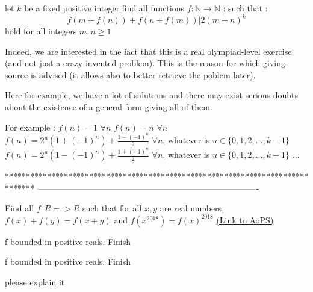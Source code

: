 \begin{solution}
	\begin{tcolorbox}let $k$ be a fixed positive integer
find all functions $f : \mathbb{N} \rightarrow \mathbb{N}$ : such that :
 $$f(m+f(n))+f(n+f(m))  | 2 (m+n)^k$$ 
hold for all integers $m,n \geq 1 $\end{tcolorbox}
Indeed, we are interested in the fact that this is a real olympiad-level exercise (and not just a crazy invented problem). This is the reason for which giving source is advised (it allows also to better retrieve the poblem later).

Here for example, we have a lot of solutions and there may exist serious doubts about the existence of a general form giving all of them.

For example :
$f(n)=1$ $\forall n$
$f(n)=n$ $\forall n$
$f(n)=2^u(1+(-1)^n)+\frac{1-(-1)^n}2$ $\forall n$, whatever is $u\in\{0,1,2,...,k-1\}$
$f(n)=2^u(1-(-1)^n)+\frac{1+(-1)^n}2$ $\forall n$, whatever is $u\in\{0,1,2,...,k-1\}$
...



\end{solution}
*******************************************************************************
-------------------------------------------------------------------------------

\begin{problem}
	Find all $f:R=>R$ such that for all $x,y$ are real numbers,
       $f (x)+f (y)= f(x+y)$   and  $f(x^{2018})=f (x)^{2018}  $
	\flushright \href{https://artofproblemsolving.com/community/c6h1606939}{(Link to AoPS)}
\end{problem}



\begin{solution}
	f bounded in positive reals. Finish
\end{solution}



\begin{solution}
	\begin{tcolorbox}f bounded in positive reals. Finish\end{tcolorbox}

please explain it
\end{solution}



